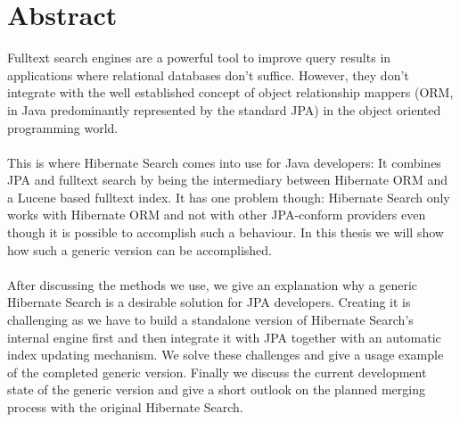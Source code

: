 \section*{Abstract}

Fulltext search engines are a powerful tool to improve query results in applications where relational databases don't suffice. However, they don't integrate with the well established concept of object relationship mappers (ORM, in Java predominantly represented by the standard JPA) in the object oriented programming world.
\\\\
This is where Hibernate Search comes into use for Java developers: It combines JPA and fulltext search by being the intermediary between Hibernate ORM and a Lucene based fulltext index. It has one problem though: Hibernate Search only works with Hibernate ORM and not with other JPA-conform providers even though it is possible to accomplish such a behaviour. In this thesis we will show how such a generic version can be accomplished.
\\\\
After discussing the methods we use, we give an explanation why a generic Hibernate Search is a desirable solution for JPA developers. Creating it is challenging as we have to build a standalone version of Hibernate Search's internal engine first and then integrate it with JPA together with an automatic index updating mechanism. We solve these challenges and give a usage example of the completed generic version. Finally we discuss the current development state of the generic version and give a short outlook on the planned merging process with the original Hibernate Search.

\pagebreak

